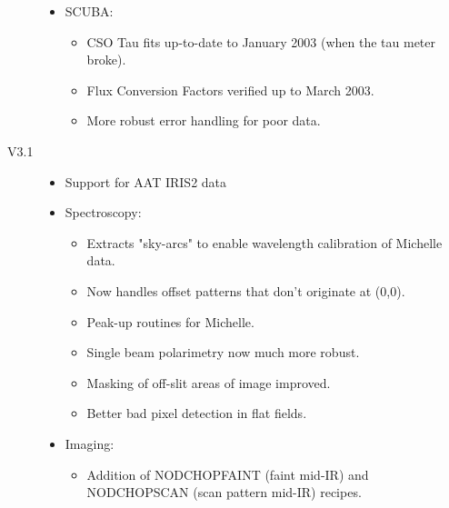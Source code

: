 \documentclass[twoside,11pt]{article}
\renewcommand{\_}{\texttt{\symbol{95}}}
\begin{document}
\begin{description}
\begin{itemize}
\begin{itemize}
\end{itemize}

\item SCUBA:

\begin{itemize}

\item CSO Tau fits up-to-date to January 2003 (when the tau meter broke).

\item Flux Conversion Factors verified up to March 2003.

\item More robust error handling for poor data.

\end{itemize}

\end{itemize}

\item[V3.1]

\begin{itemize}

\item Support for AAT IRIS2 data

\item Spectroscopy:

\begin{itemize}

\item Extracts "sky-arcs" to enable wavelength calibration of Michelle data.

\item Now handles offset patterns that don't originate at (0,0).

\item Peak-up routines for Michelle.

\item Single beam polarimetry now much more robust.

\item Masking of off-slit areas of image improved.

\item Better bad pixel detection in flat fields.

\end{itemize}

\item Imaging:

\begin{itemize}

\item Addition of NOD\_CHOP\_FAINT (faint mid-IR) and
    NOD\_CHOP\_SCAN (scan pattern mid-IR) recipes.


\end{itemize}
\end{itemize}
\end{description}
\end{document}
